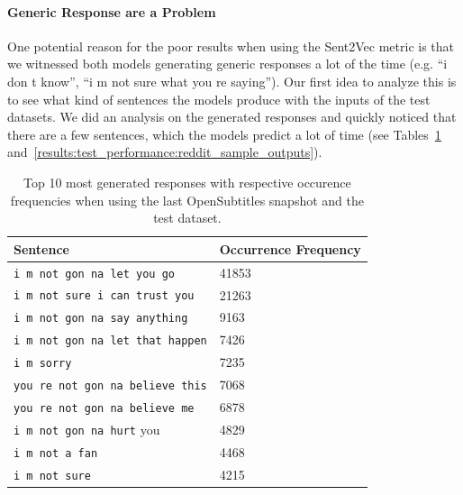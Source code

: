 \paragraph{Generic Response are a Problem} One potential reason for the poor results when using the Sent2Vec metric is that we witnessed both models generating generic responses a lot of the time (e.g. ``i don t know'', ``i m not sure what you re saying''). Our first idea to analyze this is to see what kind of sentences the models produce with the inputs of the test datasets. We did an analysis on the generated responses and quickly noticed that there are a few sentences, which the models predict a lot of time (see Tables~\ref{results:test_performance:opensubtitles_sample_outputs} and~\ref{results:test_performance:reddit_sample_outputs}).
\\
\begin{table}[H]
	\centering
	\begin{adjustbox}{max width=\textwidth}
		\begin{tabular}{ll}
			\toprule
			Sentence & Occurrence Frequency\\ \midrule
			\texttt{i m not gon na let you go} & 41853\\
			\texttt{i m not sure i can trust you} & 21263\\
			\texttt{i m not gon na say anything} & 9163\\
			\texttt{i m not gon na let that happen} & 7426\\
			\texttt{i m sorry} & 7235\\
			\texttt{you re not gon na believe this} & 7068\\
			\texttt{you re not gon na believe me} & 6878\\
			\texttt{i m not gon na hurt} you & 4829\\
			\texttt{i m not a fan} & 4468\\
			\texttt{i m not sure} & 4215\\
			\bottomrule
		\end{tabular}
	\end{adjustbox}
	\caption{Top 10 most generated responses with respective occurence frequencies when using the last OpenSubtitles snapshot and the test dataset.}
	\label{results:test_performance:opensubtitles_sample_outputs}
\end{table}


